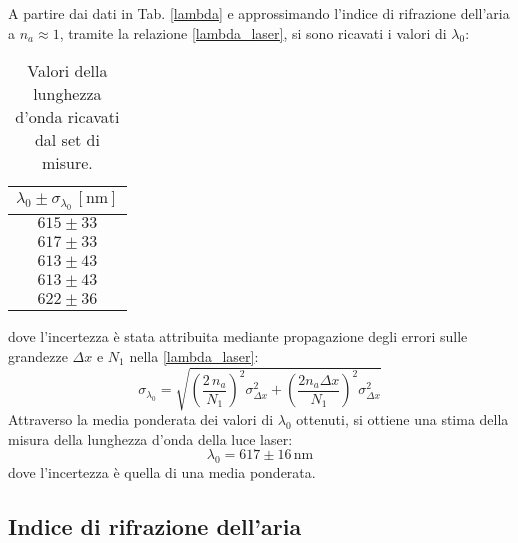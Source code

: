 \documentclass[]{article}
\let\oldsubsection\subsection%
\renewcommand{\subsection}{%
	\renewcommand{\theequation}{\thesubsection.\arabic{equation}}%
	\oldsubsection}%
\begin{document}
A partire dai dati in Tab. \ref{lambda} e approssimando l'indice di rifrazione dell'aria a $n_a \approx 1$, tramite la relazione \ref{lambda_laser}, si sono ricavati i valori di $\lambda_0$:

\begin{table}[H]
    \centering
    
    \begin{tabular}{||c||}
        \hline
        $\lambda_0 \pm \sigma_{\lambda_0} \, \left[\text{nm}\right]$ \\
        \hline\hline

        $615 \pm 33$ \\\hline
        $617 \pm 33$ \\\hline
        $613 \pm 43$ \\\hline
        $613 \pm 43$ \\\hline
        $622 \pm 36$ \\\hline
    
    \end{tabular}
    \caption{Valori della lunghezza d'onda ricavati dal set di misure.}
    \label{tab:lambda}
\end{table}
dove l'incertezza è stata attribuita mediante propagazione degli errori sulle grandezze $\Delta x$ e $N_1$ nella \ref{lambda_laser}:
\begin{equation}
\label{err-lambda}
\sigma_{\lambda_0} = \sqrt{ \left( \frac{2 \, n_a}{N_1}\right)^2 \sigma^2_{\Delta x} +  \left(\frac{2 n_a \Delta x}{N_1} \right)^2 \sigma^2_{\Delta x} }
\end{equation}
Attraverso la media ponderata dei valori di $\lambda_0$ ottenuti, si ottiene una stima della misura della lunghezza d'onda della luce laser:
\begin{equation}
\label{lambda-value}
\lambda_0 = 617 \pm 16 \, \text{nm}
\end{equation}
dove l'incertezza è quella di una media ponderata.

\subsection{Indice di rifrazione dell'aria}
\end{document}

